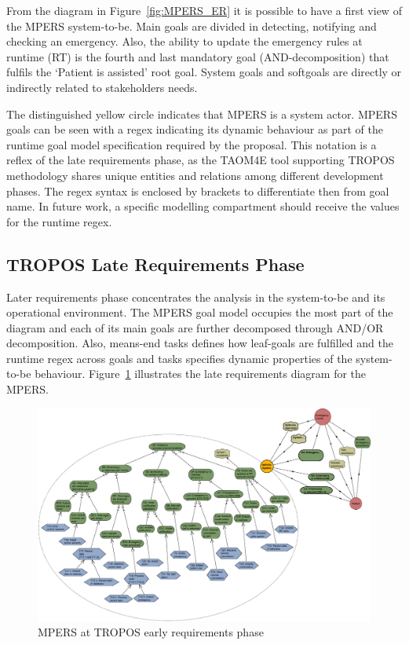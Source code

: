 From the diagram in Figure~\ref{fig:MPERS_ER} it is possible to have a first view of the MPERS system-to-be. Main goals are divided in detecting, notifying and checking an emergency. Also, the ability to update the emergency rules at runtime (RT) is the fourth and last mandatory goal (AND-decomposition) that fulfils the `Patient is assisted' root goal. System goals and softgoals are directly or indirectly related to stakeholders needs.

The distinguished yellow circle indicates that MPERS is a system actor. MPERS goals can be seen with a regex indicating its dynamic behaviour as part of the runtime goal model specification required by the proposal. This notation is a reflex of the late requirements phase, as the TAOM4E tool supporting TROPOS methodology shares unique entities and relations among different development phases. The regex syntax is enclosed by brackets to differentiate then from goal name. In future work, a specific modelling compartment should receive the values for the runtime regex.

\subsection{TROPOS Late Requirements Phase}

Later requirements phase concentrates the analysis in the system-to-be and its operational environment. The MPERS goal model occupies the most part of the diagram and each of its main goals are further decomposed through AND/OR decomposition. Also, means-end tasks defines how leaf-goals are fulfilled and the runtime regex across goals and tasks specifies dynamic properties of the system-to-be behaviour. Figure~\ref{fig:MPERS_LR} illustrates the late requirements diagram for the MPERS.

\begin{figure}[h!]
\centering
\includegraphics[width=1\textwidth]{imgs/MPERS_LR.png}
\caption{MPERS at TROPOS early requirements phase}
\label{fig:MPERS_LR}
\end{figure}

